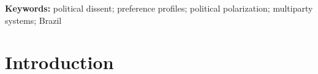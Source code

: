 \documentclass[12pt]{article}
\begin{document}
\textbf{Keywords:} political dissent; preference profiles; political polarization; multiparty systems; Brazil




\section{Introduction}









\end{document}
